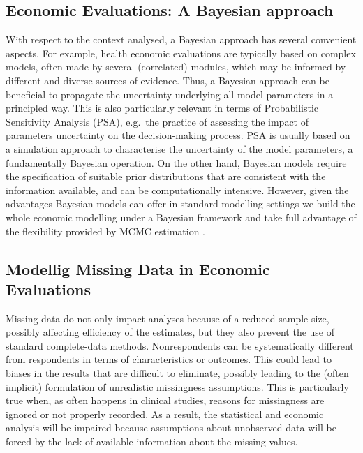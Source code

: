 \documentclass[]{article}
\begin{document}
\subsection{Economic Evaluations: A Bayesian
approach}\label{economic-evaluations-a-bayesian-approach}

With respect to the context analysed, a Bayesian approach has several convenient aspects. For
example, health economic evaluations are typically based on complex
models, often made by several (correlated) modules, which may be
informed by different and diverse sources of evidence. Thus, a Bayesian
approach can be beneficial to propagate the uncertainty underlying
all model parameters in a principled way. This is also particularly
relevant in terms of Probabilistic Sensitivity Analysis (PSA), e.g.~the
practice of assessing the impact of parameters uncertainty on the
decision-making process. PSA is usually based on a simulation approach
to characterise the uncertainty of the model parameters, a
fundamentally Bayesian operation. On the other hand, Bayesian models
require the specification of suitable prior distributions that are
consistent with the information available, and can
be computationally intensive. However, given the advantages Bayesian
models can offer in standard modelling settings we build the whole
economic modelling under a Bayesian framework and take full advantage of the
flexibility provided by MCMC estimation \citep{Brooks}.

\subsection{Modellig Missing Data in Economic
Evaluations}\label{modellig-missing-data-in-economic-evaluations}

Missing data do not only impact analyses because of a reduced sample
size, possibly affecting efficiency of the estimates, but they also
prevent the use of standard complete-data methods. Nonrespondents can be
systematically different from respondents in terms of characteristics or
outcomes. This could lead to biases in the results that are difficult to
eliminate, possibly leading to the (often implicit) formulation of
unrealistic missingness assumptions. This is particularly true when, as
often happens in clinical studies, reasons for missingness are ignored
or not properly recorded. As a result, the statistical and economic
analysis will be impaired because assumptions about unobserved data will
be forced by the lack of available information about the missing values.
\end{document}
